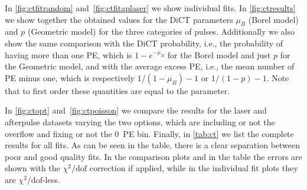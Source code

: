In \autoref{fig:ctfitrandom} and~\ref{fig:ctfitaplaser} we show individual
fits. In \autoref{fig:ctresults} we show together the obtained values for the
DiCT parameters $\mu_B$ (Borel model) and $p$ (Geometric model) for the three
categories of pulses. Additionally we also show the same comparison with the
DiCT probability, i.e., the probability of having more than one PE, which is
$1-e^{-\mu_B}$ for the Borel model and just $p$ for the Geometric model, and
with the average excess PE, i.e., the mean number of PE minus one, which is
respectively $1/(1-\mu_B)-1$ or $1/(1-p)-1$. Note that to first order these
quantities are equal to the parameter.

In \autoref{fig:ctopt} and~\ref{fig:ctpoisson} we compare the results for the
laser and afterpulse datasets varying the two options, which are including or
not the overflow and fixing or not the 0~PE bin. Finally, in \autoref{tab:ct}
we list the complete results for all fits. As can be seen in the table, there
is a clear separation between poor and good quality fits. In the comparison
plots and in the table the errors are shown with the $\chi^2/\mathrm{dof}$
correction if applied, while in the individual fit plots they are
$\chi^2/\mathrm{dof}$-less.

\begin{figure}
    
    
    
\end{figure}

\begin{figure}
    

    
\end{figure}

\begin{figure}
    
    
    
\end{figure}

